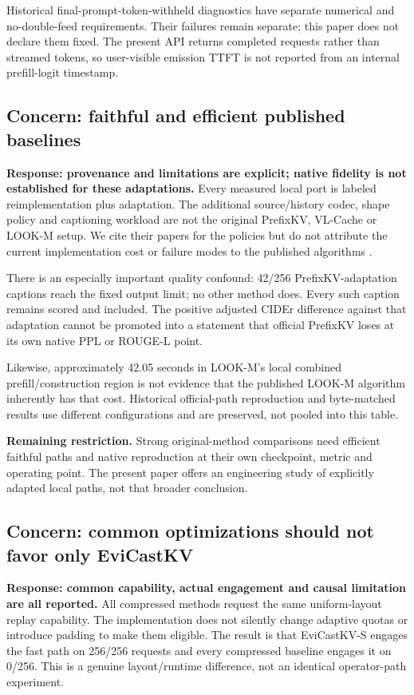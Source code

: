 \documentclass[11pt]{article}
\begin{document}
Historical final-prompt-token-withheld diagnostics have separate numerical
and no-double-feed requirements. Their failures remain separate; this
paper does not declare them fixed. The present API returns completed
requests rather than streamed tokens, so user-visible emission TTFT is
not reported from an internal prefill-logit timestamp.

\subsection{Concern: faithful and efficient published baselines}
\textbf{Response: provenance and limitations are explicit; native fidelity
is not established for these adaptations.}
Every measured local port is labeled reimplementation plus adaptation.
The additional source/history codec, shape policy and captioning workload
are not the original PrefixKV, VL-Cache or LOOK-M setup. We cite their
papers for the policies but do not attribute the current implementation
cost or failure modes to the published algorithms
\citep{wang2025prefixkv,tu2025vlcache,wan2024lookm}.

There is an especially important quality confound: 42/256 PrefixKV-adaptation
captions reach the fixed output limit; no other method does. Every such
caption remains scored and included. The positive adjusted CIDEr
difference against that adaptation cannot be promoted into a statement
that official PrefixKV loses at its own native PPL or ROUGE-L point.

Likewise, approximately 42.05 seconds in LOOK-M's local combined
prefill/construction region is not evidence that the published LOOK-M
algorithm inherently has that cost. Historical official-path reproduction
and byte-matched results use different configurations and are preserved,
not pooled into this table.

\textbf{Remaining restriction.} Strong original-method comparisons need
efficient faithful paths and native reproduction at their own checkpoint,
metric and operating point. The present paper offers an engineering study
of explicitly adapted local paths, not that broader conclusion.

\subsection{Concern: common optimizations should not favor only EviCastKV}
\textbf{Response: common capability, actual engagement and causal limitation
are all reported.}
All compressed methods request the same uniform-layout replay capability.
The implementation does not silently change adaptive quotas or introduce
padding to make them eligible. The result is that EviCastKV-S engages
the fast path on 256/256 requests and every compressed baseline engages
it on 0/256. This is a genuine layout/runtime difference, not an identical
operator-path experiment.
\end{document}
